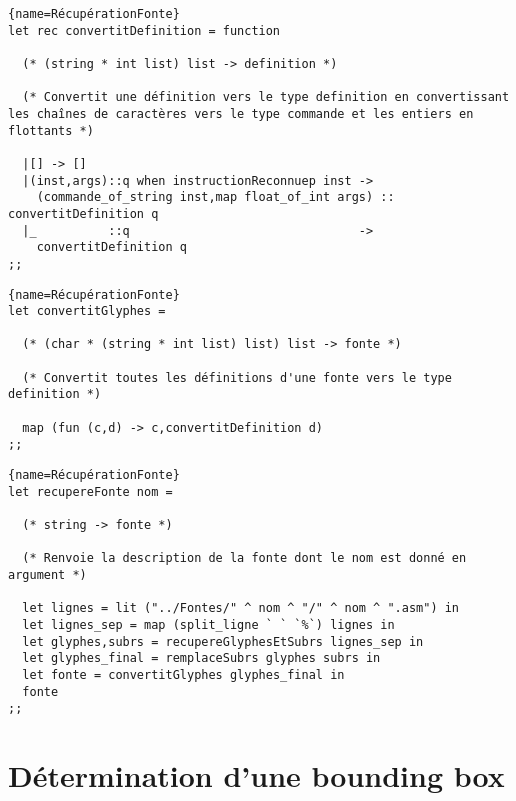\documentclass[10pt,twoside,a4paper]{article}
\begin{document}
\begin{lstlisting}{name=RécupérationFonte}
let rec convertitDefinition = function

  (* (string * int list) list -> definition *)

  (* Convertit une définition vers le type definition en convertissant les chaînes de caractères vers le type commande et les entiers en flottants *)

  |[] -> []
  |(inst,args)::q when instructionReconnuep inst ->
    (commande_of_string inst,map float_of_int args) :: convertitDefinition q
  |_          ::q                                ->
    convertitDefinition q
;;
\end{lstlisting}
\pagebreak
\begin{lstlisting}{name=RécupérationFonte}
let convertitGlyphes =

  (* (char * (string * int list) list) list -> fonte *)

  (* Convertit toutes les définitions d'une fonte vers le type definition *)
  
  map (fun (c,d) -> c,convertitDefinition d)
;;
\end{lstlisting}

\begin{lstlisting}{name=RécupérationFonte}
let recupereFonte nom =

  (* string -> fonte *)

  (* Renvoie la description de la fonte dont le nom est donné en argument *)
  
  let lignes = lit ("../Fontes/" ^ nom ^ "/" ^ nom ^ ".asm") in
  let lignes_sep = map (split_ligne ` ` `%`) lignes in
  let glyphes,subrs = recupereGlyphesEtSubrs lignes_sep in
  let glyphes_final = remplaceSubrs glyphes subrs in
  let fonte = convertitGlyphes glyphes_final in
  fonte
;;
\end{lstlisting}

\section{Détermination d'une bounding box}%
\end{document}
